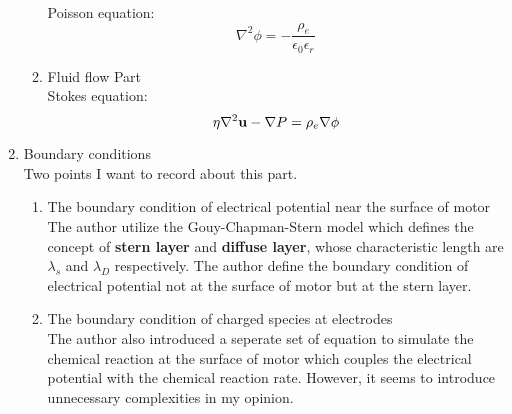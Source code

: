 \documentclass[fontsize=11pt, %
                             paper=a4, %
                             twoside, %
                             captions=tableheading,
                             index=totoc,
                             hyperref]{labbook}
\begin{document}
\begin{addmargin}[4cm]{0cm}
\begin{enumerate}
\begin{enumerate}
Poisson equation:
\begin{equation}
\nabla^2\phi=-\frac{\rho_e}{\epsilon_0\epsilon_r}
\end{equation}
\item Fluid flow Part\\
Stokes equation:
\begin{equation}
\eta \nabla^2\mathbf{u} -\nabla P=\rho_e \nabla \phi
\end{equation}
\end{enumerate}
\item Boundary conditions\\
Two points I want to record about this part. 
\begin{enumerate}
\item
The boundary condition of electrical potential near the surface of motor\\
The author utilize the Gouy-Chapman-Stern model which defines the concept of \textbf{stern layer} and \textbf{diffuse layer}, whose characteristic length are $\lambda_s$ and $\lambda_D$ respectively. The author define the boundary condition of electrical potential not at the surface of motor but at the stern layer.
\item
The boundary condition of charged species at electrodes\\
The author also introduced a seperate set of equation to simulate the chemical reaction at the surface of motor which couples the electrical potential with the chemical reaction rate. However, it seems to introduce unnecessary complexities in my opinion.
\end{enumerate}
\end{enumerate}
\end{addmargin}





\end{document}
